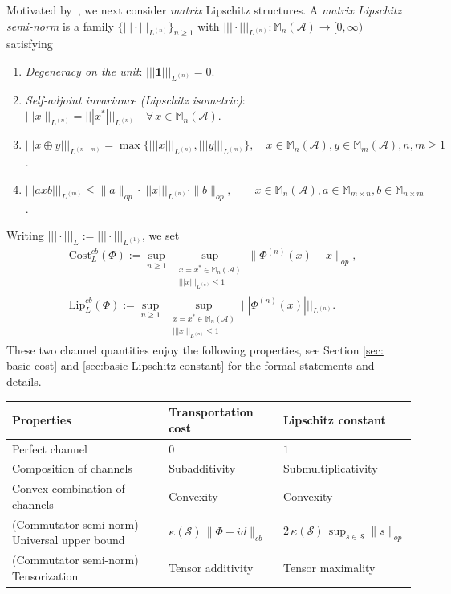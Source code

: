 \documentclass[11pt,reqno]{amsart}
\numberwithin{equation}{section}
\newcommand{\mb}{\mathbb}
\newcommand{\mc}{\mathcal}
\newcommand{\Lip}{\mathrm{Lip}}
\newcommand{\Cost}{\mathrm{Cost}}
\begin{document}
Motivated by~\cite{wu2005noncommutativemetricsmatrixstate}, we next consider \emph{matrix} Lipschitz structures.  A \textit{matrix Lipschitz semi-norm} is a family $\{|||\!\cdot\!|||_{L^{(n)}}\}_{n\ge 1}$ with
$|||\!\cdot\!|||_{L^{(n)}}:\mb M_{n}(\mc A)\to[0,\infty)$ satisfying
\begin{enumerate}
    \item \textit{Degeneracy on the unit}: $|||\textbf{1}|||_{L^{(n)}} = 0.$
    \item \textit{Self-adjoint invariance (Lipschitz isometric)}: $|||x|||_{L^{(n)}} = |||x^*|||_{L^{(n)}} \quad \forall\, x \in \mb M_n(\mc A)$.
    \item $|||x \oplus y|||_{L^{(n+m)}} = \max\{|||x|||_{L^{(n)}}, |||y|||_{L^{(m)}}\},\quad x\in \mb M_n(\mc A), y \in \mb M_m(\mc A), n,m\ge 1$.
    \item $|||axb|||_{L^{(m)}} \le \|a\|_{op}\cdot |||x|||_{L^{(n)}} \cdot \|b\|_{op},\quad \quad x\in \mb M_n(\mc A), a\in \mb M_{m\times n}, b\in \mb M_{n\times m}$.
\end{enumerate}
Writing $|||\!\cdot\!|||_{L}:=|||\!\cdot\!|||_{L^{(1)}}$, we set
\begin{align*}
  &\Cost_{L}^{cb}(\Phi):=
    \sup_{n\ge 1}\;
    \sup_{\substack{x=x^{*}\in\mb M_{n}(\mc A)\\|||x|||_{L^{(n)}}\le 1}}
    \bigl\|\Phi^{(n)}(x)-x\bigr\|_{op},
  \\
  &\Lip_{L}^{cb}(\Phi):=
    \sup_{n\ge 1}\;
    \sup_{\substack{x=x^{*}\in\mb M_{n}(\mc A)\\|||x|||_{L^{(n)}}\le 1}}
    |||\Phi^{(n)}(x)|||_{L^{(n)}}.
\end{align*}
These two channel quantities enjoy the following properties, see Section \ref{sec: basic cost} and \ref{sec:basic Lipschitz constant} for the formal statements and details.
\\
\renewcommand{\arraystretch}{1.2}
\begin{center}
\begin{tabular}{|p{}|p{}|p{}|}
\hline
\centering \textbf{Properties} &
\centering \textbf{Transportation cost} &
\centering \textbf{Lipschitz constant}\tabularnewline
\hline\hline
\centering Perfect channel &
\centering $0$ &
\centering $1$\tabularnewline
\hline
\centering Composition of channels &
\centering Subadditivity &
\centering Submultiplicativity\tabularnewline
\hline
\centering Convex combination of channels &
\centering Convexity &
\centering Convexity\tabularnewline
\hline
\centering (Commutator semi-norm) Universal upper bound &
\centering $\kappa(\mc S)\,\|\Phi-id\|_{cb}$ &
\centering $2\,\kappa(\mc S)\,\displaystyle\sup_{s\in\mc S}\|s\|_{op}$\tabularnewline
\hline
\centering (Commutator semi-norm) Tensorization &
\centering Tensor additivity &
\centering Tensor maximality\tabularnewline
\hline
\end{tabular}
\end{center}
\end{document}
